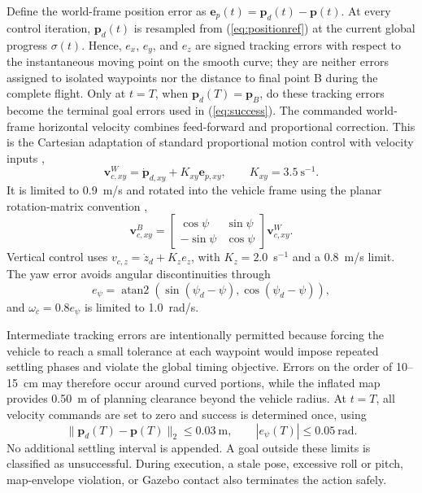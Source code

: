 \documentclass[conference]{IEEEtran}
\begin{document}
Define the world-frame position error as
$\mathbf{e}_p(t)=\mathbf{p}_d(t)-\mathbf{p}(t)$. At every control iteration,
$\mathbf{p}_d(t)$ is resampled from (\ref{eq:positionref}) at the current global
progress $\sigma(t)$. Hence, $e_x$, $e_y$, and $e_z$ are signed tracking errors
with respect to the instantaneous moving point on the smooth curve; they are
neither errors assigned to isolated waypoints nor the distance to final point B
during the complete flight. Only at $t=T$, when
$\mathbf{p}_d(T)=\mathbf{p}_B$, do these tracking errors become the terminal
goal errors used in (\ref{eq:success}). The commanded world-frame horizontal
velocity combines feed-forward and proportional correction. This is the
Cartesian adaptation of standard proportional motion control with velocity
inputs \cite[Ch.~11]{lynchpark2017},
\begin{equation}
 \mathbf{v}_{c,xy}^{W}=\dot{\mathbf{p}}_{d,xy}+K_{xy}\mathbf{e}_{p,xy},
 \qquad K_{xy}=3.5~\text{s}^{-1}.
 \label{eq:controller}
\end{equation}
It is limited to 0.9~m/s and rotated into the vehicle frame using the planar
rotation-matrix convention \cite[Ch.~3]{lynchpark2017},
\begin{equation}
 \mathbf{v}_{c,xy}^{B}=
 \begin{bmatrix}\cos\psi&\sin\psi\\-\sin\psi&\cos\psi\end{bmatrix}
 \mathbf{v}_{c,xy}^{W}.
 \label{eq:rotation}
\end{equation}
Vertical control uses
$v_{c,z}=\dot z_d+K_z e_z$, with $K_z=2.0$~s$^{-1}$ and a 0.8~m/s limit. The
yaw error avoids angular discontinuities through
\begin{equation}
 e_\psi=\operatorname{atan2}\!\left(\sin(\psi_d-\psi),
 \cos(\psi_d-\psi)\right),
\end{equation}
and $\omega_c=0.8e_\psi$ is limited to 1.0~rad/s.

Intermediate tracking errors are intentionally permitted because forcing the
vehicle to reach a small tolerance at each waypoint would impose repeated
settling phases and violate the global timing objective. Errors on the order of
10--15~cm may therefore occur around curved portions, while the inflated map
provides 0.50~m of planning clearance beyond the vehicle radius. At $t=T$, all
velocity commands are set to zero and success is determined once, using
\begin{equation}
 \lVert\mathbf{p}_d(T)-\mathbf{p}(T)\rVert_2\leq0.03~\text{m},\qquad
 |e_\psi(T)|\leq0.05~\text{rad}.
 \label{eq:success}
\end{equation}
No additional settling interval is appended. A goal outside these limits is
classified as unsuccessful. During execution, a stale pose, excessive roll or
pitch, map-envelope violation, or Gazebo contact also terminates the action
safely.
\end{document}
